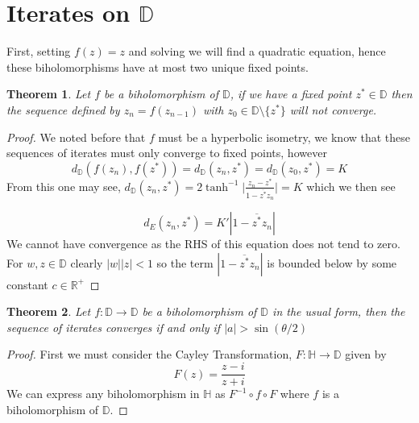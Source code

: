 \documentclass{article}
\newcommand{\R}{\mathbb{R}}
\newcommand{\D}{\mathbb{D}}
\newcommand{\Hp}{\mathbb{H}}
\newtheorem{theorem}{Theorem}
\begin{document}
\section{Iterates on $\D$}
First, setting $f(z) = z$ and solving we will find a quadratic equation, hence these biholomorphisms have at most two unique fixed points.
\begin{theorem}
    Let $f$ be a biholomorphism of $\D$, if we have a fixed point $z^*\in\D$ then the sequence defined by $z_n = f(z_{n-1})$ with $z_0\in\D\setminus\{z^*\}$ will not converge.
\end{theorem}
\begin{proof}
    We noted before that $f$ must be a hyperbolic isometry, we know that these sequences of iterates must only converge to fixed points, however
    \begin{equation*}
        d_\D(f(z_n), f(z^*)) = d_\D(z_n, z^*) = d_\D(z_0, z^*) = K
    \end{equation*}
    From this one may see, $d_\D(z_n, z^*) = 2 \tanh^{-1}\bigg|\frac{z_n - z^*}{1-\overline{z^*}z_n} \bigg|  = K$ which we then see 

    \begin{equation*}
        d_E(z_n, z^*) = K'|1-\overline{z^*}z_n|
    \end{equation*}
    We cannot have convergence as the RHS of this equation does not tend to zero. For $w, z\in\D$ clearly $|w||z| < 1$ so the term $|1-\overline{z^*}z_n|$ is bounded below by some constant $c\in\R^+$
\end{proof}
\begin{theorem}
    Let $f:\D\to\D$ be a biholomorphism of $\D$ in the usual form, then the sequence of iterates converges if and only if $|a| > \sin(\theta/2)$
\end{theorem}
\begin{proof}
    First we must consider the Cayley Transformation, $F:\Hp\to\D$ given by
    \begin{equation*}
        F(z) = \frac{z - i}{z + i}
    \end{equation*}
    We can express any biholomorphism in $\Hp$ as $F^{-1}\circ f \circ F$ where $f$ is a biholomorphism of $\D$.
\end{proof}
\end{document}
